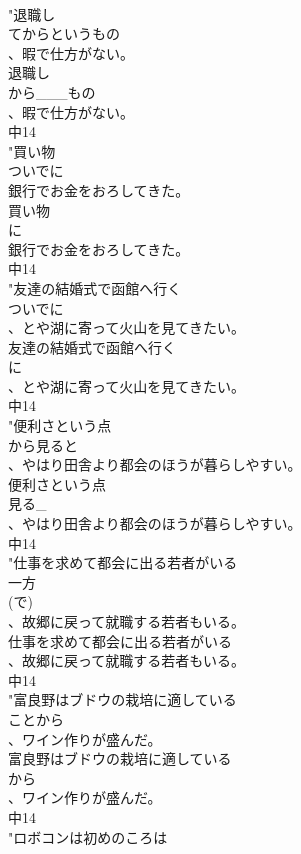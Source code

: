 \documentclass[8pt]{extreport}
\begin{document}
\begin{CJK}{UTF8}{min}
\\	"退職し
\\	てからというもの
\\	、暇で仕方がない。
\\	退職し
\\	から___もの
\\	、暇で仕方がない。
\\	中14
\\	"買い物
\\	ついでに
\\	銀行でお金をおろしてきた。
\\	買い物
\\	に
\\	銀行でお金をおろしてきた。
\\	中14
\\	"友達の結婚式で函館へ行く
\\	ついでに
\\	、とや湖に寄って火山を見てきたい。
\\	友達の結婚式で函館へ行く
\\	に
\\	、とや湖に寄って火山を見てきたい。
\\	中14
\\	"便利さという点
\\	から見ると
\\	、やはり田舎より都会のほうが暮らしやすい。
\\	便利さという点
\\	見る_
\\	、やはり田舎より都会のほうが暮らしやすい。
\\	中14
\\	"仕事を求めて都会に出る若者がいる
\\	一方
\\	(で)
\\	、故郷に戻って就職する若者もいる。
\\	仕事を求めて都会に出る若者がいる
\\	、故郷に戻って就職する若者もいる。
\\	中14
\\	"富良野はブドウの栽培に適している
\\	ことから
\\	、ワイン作りが盛んだ。
\\	富良野はブドウの栽培に適している
\\	から
\\	、ワイン作りが盛んだ。
\\	中14
\\	"ロボコンは初めのころは

\end{CJK}
\end{document}

